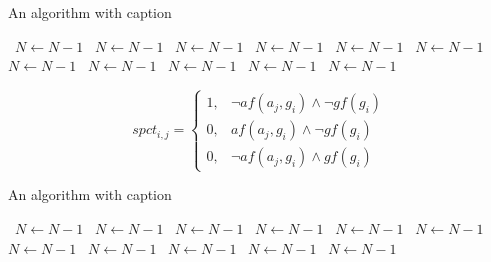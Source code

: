 \documentclass[a4paper]{article}
\begin{document}
\begin{algorithm}
\caption{An algorithm with caption}
\begin{algorithmic}
\    \State $N \gets N - 1$
\    \State $N \gets N - 1$
\    \State $N \gets N - 1$
\    \State $N \gets N - 1$
\    \State $N \gets N - 1$
\    \State $N \gets N - 1$
\    \State $N \gets N - 1$
\    \State $N \gets N - 1$
\    \State $N \gets N - 1$
\    \State $N \gets N - 1$
\    \State $N \gets N - 1$
\EndWhile
\end{algorithmic}
\end{algorithm}

\begin{equation}
spct_{i,j} =
\begin{cases}
1, & \text{$\neg af(a_j,g_i) \wedge \neg gf(g_i)$}\\
0, & \text{$af(a_j,g_i) \wedge \neg gf(g_i)$}\\
0, & \text{$\neg af(a_j,g_i) \wedge gf(g_i)$}
\end{cases}
\end{equation}

\begin{algorithm}
\caption{An algorithm with caption}
\begin{algorithmic}
\    \State $N \gets N - 1$
\    \State $N \gets N - 1$
\    \State $N \gets N - 1$
\    \State $N \gets N - 1$
\    \State $N \gets N - 1$
\    \State $N \gets N - 1$
\    \State $N \gets N - 1$
\    \State $N \gets N - 1$
\    \State $N \gets N - 1$
\    \State $N \gets N - 1$
\    \State $N \gets N - 1$
\EndWhile
\end{algorithmic}
\end{algorithm}
\end{document}
